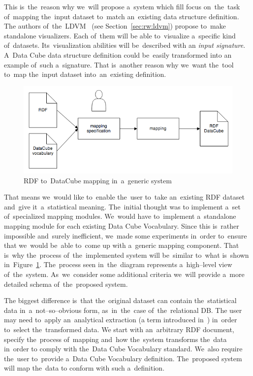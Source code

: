 This is~the~reason why we~will propose a~system which fill focus on~the~task of~mapping the~input dataset to~match an~existing data structure definition. 
The authors of~the~LDVM~\cite{ldvm} (see Section~\ref{sec:rw:ldvm}) propose to~make standalone
visualizers. Each of~them will 
be able to~visualize a~specific kind of~datasets. Its~visualization abilities will be~described with
an \emph{input signature}. A~Data Cube data structure definition could be~easily transformed into
an example of~such a~signature. That is~another reason why we~want the~tool to~map the~input dataset into~an~existing definition.

\begin{figure}
	\centering
	\includegraphics[width=140mm]{img/generic-mapping.png}
	\caption{RDF to~DataCube mapping in~a~generic system}
	\label{fig:generic-mapping}
\end{figure}

That means we~would like to~enable the~user to~take an~existing RDF
dataset and~give it~a~statistical meaning. The~initial thought was to
implement a~set of~specialized 
mapping modules. We~would have to~implement a~standalone mapping module for
each existing Data Cube Vocabulary. Since this is~rather impossible and~surely inefficient, we~made some experiments in~order to~ensure that we~would be~able to~come 
up with a~generic mapping component. That is~why the~process of~the~implemented
system will be~similar to~what is~shown in~Figure~\ref{fig:generic-mapping}. The~process seen in~the~diagram represents a~high--level view of~the~system. As~we~consider some additional criteria we~will provide a~more detailed schema of~the~proposed system. 

The biggest difference is~that the~original dataset can contain the~statistical 
data in~a~not--so--obvious form, as~in~the~case of~the~relational DB.
The user may need to~apply an~analytical 
extraction (a term introduced in~\cite{ldvm}) in~order to~select the~transformed data.
We start with an~arbitrary RDF document, 
specify the~process of~mapping and~how the~system transforms the~data in~order
to comply with the~Data Cube Vocabulary standard. We~also require the~user to~provide a~Data Cube Vocabulary definition. The~proposed system will map the~data
to conform with such a~definition.

